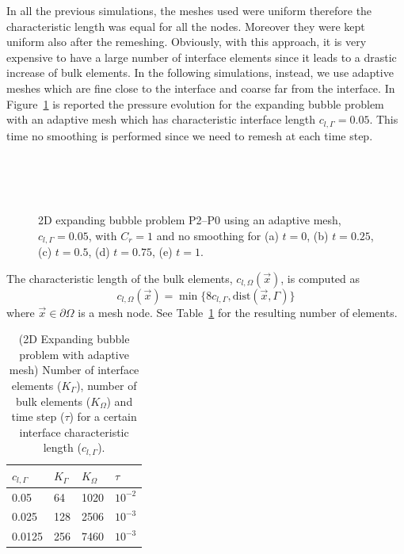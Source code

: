 \documentclass[a4paper,12pt,onecolumn]{article}
\begin{document}
In all the previous simulations, the meshes used were uniform therefore the characteristic length was equal for all the nodes. Moreover they were kept uniform also after the remeshing. Obviously, with this approach, it is very expensive to have a large number of interface elements since it leads to a drastic increase of bulk elements. In the following simulations, instead, we use adaptive meshes which are fine close to the interface and coarse far from the interface. In Figure~\ref{fig:expanding_bubble_adaptive} is reported the pressure evolution for the expanding bubble problem with an adaptive mesh which has characteristic interface length $c_{l,\Gamma}=0.05$. This time no smoothing is performed since we need to remesh at each time step.

\begin{figure}[htbp]
  \centering
  \\
  \quad
  \\
  \quad
  \\
  \caption{2D expanding bubble problem P2--P0 using an adaptive mesh, $c_{l,\Gamma}=0.05$, with $C_r=1$ and no smoothing for (a) $t=0$, (b) $t=0.25$, (c) $t=0.5$, (d) $t=0.75$, (e) $t=1$.}
  \label{fig:expanding_bubble_adaptive}
\end{figure}

The characteristic length of the bulk elements, $c_{l,\Omega}(\vec{x})$, is computed as
\begin{equation}\label{eq:adaptive_criteria}
 c_{l,\Omega}(\vec{x})=\min\big\{8c_{l,\Gamma},\textrm{dist}(\vec{x},\Gamma)\big\}
\end{equation}
where $\vec{x}\in\partial\Omega$ is a mesh node. See Table~\ref{tab:expandingbubble2Delements_adaptive} for the resulting number of elements. 
\begin{table}
 \center
\begin{tabular}{llll}
\hline
$c_{l,\Gamma}$ & $K_\Gamma$ & $K_\Omega$ & $\tau$ \\
\hline
0.05 & 64 & 1020 & $10^{-2}$ \\
0.025 & 128 & 2506 & $10^{-3}$\\
0.0125 & 256 & 7460 & $10^{-3}$\\
\hline
\end{tabular}
\caption{(2D Expanding bubble problem with adaptive mesh) Number of interface elements ($K_\Gamma$), number of bulk elements ($K_\Omega$) and time step ($\tau$) for a certain interface characteristic length ($c_{l,\Gamma}$).}
\label{tab:expandingbubble2Delements_adaptive}
\end{table}
\end{document}
